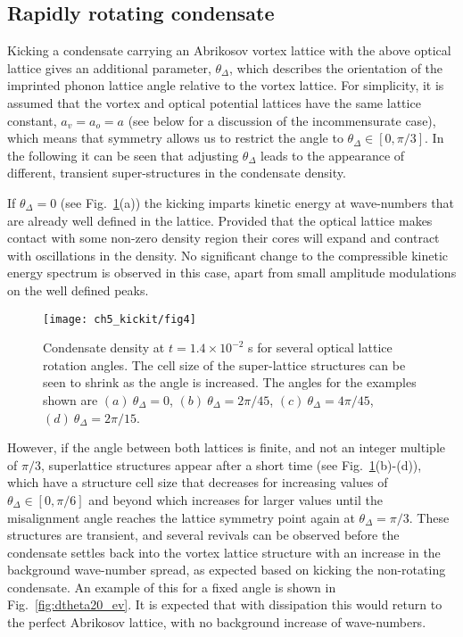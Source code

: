 \subsection{Rapidly rotating condensate}

    Kicking a condensate carrying an Abrikosov vortex lattice with the above optical lattice gives an additional parameter, $\theta_\Delta$, which describes the orientation of the imprinted phonon lattice angle relative to the vortex lattice. For simplicity, it is assumed that the vortex and optical potential lattices have the same lattice constant, $a_v=a_o=a$ (see below for a discussion of the incommensurate case), which means that symmetry allows us to restrict the angle to $\theta_\Delta\in[0,\pi/3]$. In the following it can be seen that adjusting $\theta_\Delta$ leads to the appearance of different, transient super-structures in the condensate density.

    If $\theta_\Delta=0$ (see Fig.~\ref{fig:moire_density}(a)) the kicking imparts kinetic energy at wave-numbers that are already well defined in the lattice. Provided that the optical lattice makes contact with some non-zero density region their cores will expand and contract with oscillations in the density. No significant change to the compressible kinetic energy spectrum is observed in this case, apart from small amplitude modulations on the well defined peaks.

	\begin{figure}[tb]
        \centering
			\texttt{[image: ch5\_kickit/fig4]}
			\caption[Effect of kicking on condensate with a large vortex lattice.]{Condensate density at $t=1.4\times10^{-2}$ s for several optical lattice rotation angles. The cell size of the super-lattice structures can be seen to shrink as the angle is increased. The angles for the examples shown are $(a)~\theta_\Delta=0$, $(b)~\theta_\Delta=2\pi/45$, $(c)~\theta_\Delta=4\pi/45$, $(d)~\theta_\Delta=2\pi/15$. }
			\label{fig:moire_density}
		\end{figure}

    However, if the angle between both lattices is finite, and not an integer multiple of $\pi/3$, superlattice structures appear after a short time (see Fig.~\ref{fig:moire_density}(b)-(d)), which have a structure cell size that decreases for increasing values of $\theta_\Delta\in[0,\pi/6]$ and beyond which increases for larger values until the misalignment angle reaches the lattice symmetry point again at $\theta_\Delta=\pi/3$. These structures are transient, and several revivals can be observed before the condensate settles back into the vortex lattice structure with an increase in the background wave-number spread, as expected based on kicking the non-rotating condensate. An example of this for a fixed angle is shown in Fig.~\ref{fig:dtheta20_ev}. It is expected that with dissipation this would return to the perfect Abrikosov lattice, with no background increase of wave-numbers.

